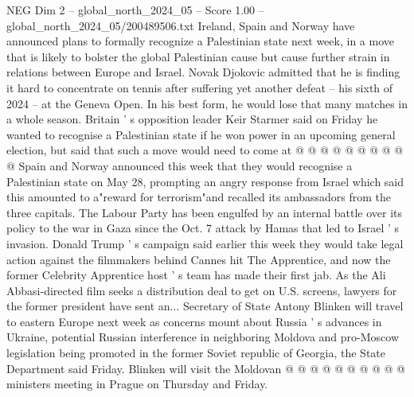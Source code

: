 \begin{textsample}{NEG Dim 2 – global\_north\_2024\_05 – Score 1.00 – global\_north\_2024\_05/200489506.txt}
Ireland, Spain and Norway have announced plans to formally recognize a Palestinian state next week, in a move that is likely to bolster the global Palestinian cause but cause further strain in relations between Europe and Israel.
Novak Djokovic admitted that he is finding it hard to concentrate on tennis after suffering yet another defeat -- his sixth of 2024 -- at the Geneva Open.
In his best form, he would lose that many matches in a whole season.
Britain ' s opposition leader Keir Starmer said on Friday he wanted to recognise a Palestinian state if he won power in an upcoming general election, but said that such a move would need to come at @ @ @ @ @ @ @ @ @ @ Spain and Norway announced this week that they would recognise a Palestinian state on May 28, prompting an angry response from Israel which said this amounted to a"reward for terrorism"and recalled its ambassadors from the three capitals.
The Labour Party has been engulfed by an internal battle over its policy to the war in Gaza since the Oct. 7 attack by Hamas that led to Israel ' s invasion.
Donald Trump ' s campaign said earlier this week they would take legal action against the filmmakers behind Cannes hit The Apprentice, and now the former Celebrity Apprentice host ' s team has made their first jab.
As the Ali Abbasi-directed film seeks a distribution deal to get on U.S. screens, lawyers for the former president have sent an...
Secretary of State Antony Blinken will travel to eastern Europe next week as concerns mount about Russia ' s advances in Ukraine, potential Russian interference in neighboring Moldova and pro-Moscow legislation being promoted in the former Soviet republic of Georgia, the State Department said Friday.
Blinken will visit the Moldovan @ @ @ @ @ @ @ @ @ @ ministers meeting in Prague on Thursday and Friday.

\end{textsample}
